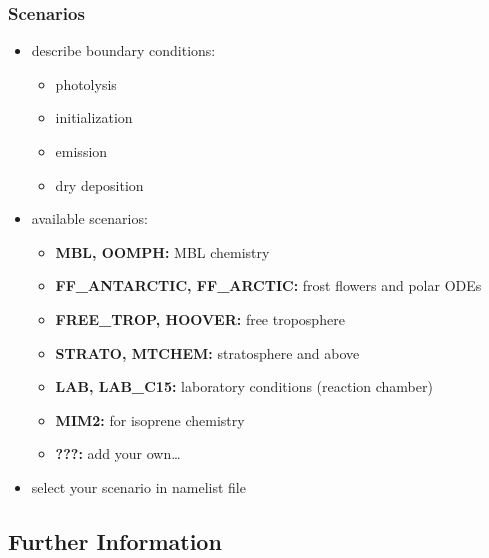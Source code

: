 \documentclass[t]{beamer}
\begin{document}
\begin{frame}

  \frametitle{Scenarios}

  \begin{itemize}
  \item describe boundary conditions:
    \begin{itemize}
    \item photolysis
    \item initialization
    \item emission
    \item dry deposition
    \end{itemize}
  \item available scenarios:
    \begin{itemize}
    \item {\bf MBL, OOMPH:} MBL chemistry
    \item {\bf FF\_ANTARCTIC, FF\_ARCTIC:} frost flowers and polar ODEs
    \item {\bf FREE\_TROP, HOOVER:} free troposphere
    \item {\bf STRATO, MTCHEM:} stratosphere and above
    \item {\bf LAB, LAB\_C15:} laboratory conditions (reaction chamber)
    \item {\bf MIM2:} for isoprene chemistry \citep{2272}
    \item {\bf ???:} add your own\dots
    \end{itemize}
  \item select your scenario in namelist file
  \end{itemize}

\end{frame}


\subsection{Further Information}
\end{document}
